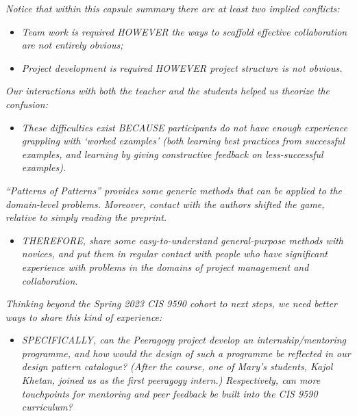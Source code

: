 \documentclass[acmlarge,timestamp]{acmart}
\begin{document}
\smallskip
\noindent\emph{Notice that within this capsule summary there are at least two implied conflicts:}
\begin{itemize}
\item \emph{Team work is required HOWEVER the ways to scaffold effective collaboration are not entirely obvious;}
\item \emph{Project development is required HOWEVER project structure is not obvious.}
\end{itemize}
\emph{Our interactions with both the teacher and the students helped us theorize the confusion:}
\begin{itemize}
\item \emph{These difficulties exist BECAUSE participants do not have enough experience grappling with ‘worked examples’ (both learning best practices from successful examples, and learning by giving constructive feedback on less-successful examples).}
\end{itemize}
\emph{“Patterns of Patterns” provides some generic methods that can be applied to the domain-level problems.  Moreover, contact with the authors shifted the game, relative to simply reading the preprint.}
\begin{itemize}
\item \emph{THEREFORE, share some easy-to-understand general-purpose methods with novices, and put them in regular contact with people who have significant experience with problems in the domains of project management and collaboration.}
\end{itemize}
\emph{Thinking beyond the Spring 2023 CIS 9590 cohort to next steps, we need better ways to share this kind of experience:}
\begin{itemize}
\item \emph{SPECIFICALLY, can the Peeragogy project develop an internship/mentoring programme, and how would the design of such a programme be reflected in our design pattern catalogue?  (After the course, one of Mary’s students, Kajol Khetan, joined us as the first peeragogy intern.)  Respectively, can more touchpoints for mentoring and peer feedback be built into the CIS 9590 curriculum?}
\end{itemize}


\end{document}
